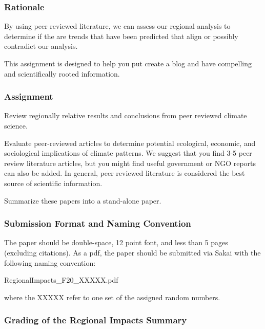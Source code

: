 
\subsubsection{Rationale}

By using peer reviewed literature, we can assess our regional analysis to determine if the are trends that have been predicted that align or possibly contradict our analysis. 

This assignment is designed to help you put create a blog and have compelling {\color{red}and scientifically rooted information}. 

\subsubsection{Assignment}

Review regionally relative results and conclusions from peer reviewed climate science. %


Evaluate peer-reviewed articles to determine potential ecological, economic, and sociological implications of climate patterns. We suggest that you find 3-5 peer review literature articles, but you might fin{\color{red}d} useful government or NGO reports can also be added. {\color{red}In general, peer reviewed literature is considered the best source of scientific information.} 

Summarize these papers into a stand-alone paper. 

\subsubsection{Submission Format and Naming Convention}

The paper should be double-space, 12 point font, and less than 5 pages (excluding citations). As a pdf, the paper should be submitted via Sakai with the following naming convention:

\begin{center}
RegionalImpacts\_F20\_XXXXX.pdf
\end{center}

\medskip \noindent where the XXXXX refer to one set of the assigned random numbers. 

\subsubsection{Grading of the Regional Impacts Summary}

